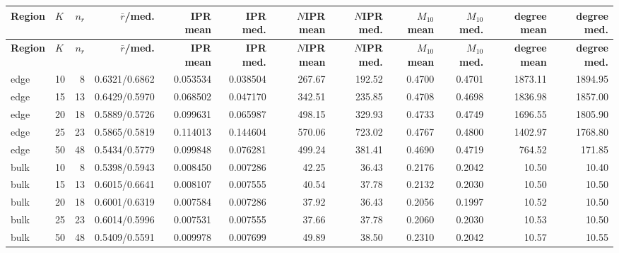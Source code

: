 \documentclass[10pt,letterpaper]{article}
\newcommand{\Hdr}[1]{\cellcolor{navy}\color{white}\bfseries #1}
\begin{document}
\scriptsize\setlength{\tabcolsep}{1.2pt}
\begin{longtable}{|l|l|r|r|r|r|r|r|r|r|r|r|}\hline
\Hdr{Region} & \Hdr{$K$} & \Hdr{$n_r$} & \Hdr{$\bar r$/med.} & \Hdr{IPR mean} & \Hdr{IPR med.} & \Hdr{$N$IPR mean} & \Hdr{$N$IPR med.} & \Hdr{$M_{10}$ mean} & \Hdr{$M_{10}$ med.} & \Hdr{degree mean} & \Hdr{degree med.}\\\hline\endfirsthead
\hline \Hdr{Region} & \Hdr{$K$} & \Hdr{$n_r$} & \Hdr{$\bar r$/med.} & \Hdr{IPR mean} & \Hdr{IPR med.} & \Hdr{$N$IPR mean} & \Hdr{$N$IPR med.} & \Hdr{$M_{10}$ mean} & \Hdr{$M_{10}$ med.} & \Hdr{degree mean} & \Hdr{degree med.}\\\hline\endhead
edge & 10 & 8 & 0.6321/0.6862 & 0.053534 & 0.038504 & 267.67 & 192.52 & 0.4700 & 0.4701 & 1873.11 & 1894.95 \\\hline
edge & 15 & 13 & 0.6429/0.5970 & 0.068502 & 0.047170 & 342.51 & 235.85 & 0.4708 & 0.4698 & 1836.98 & 1857.00 \\\hline
edge & 20 & 18 & 0.5889/0.5726 & 0.099631 & 0.065987 & 498.15 & 329.93 & 0.4733 & 0.4749 & 1696.55 & 1805.90 \\\hline
edge & 25 & 23 & 0.5865/0.5819 & 0.114013 & 0.144604 & 570.06 & 723.02 & 0.4767 & 0.4800 & 1402.97 & 1768.80 \\\hline
edge & 50 & 48 & 0.5434/0.5779 & 0.099848 & 0.076281 & 499.24 & 381.41 & 0.4690 & 0.4719 & 764.52 & 171.85 \\\hline
\hline
bulk & 10 & 8 & 0.5398/0.5943 & 0.008450 & 0.007286 & 42.25 & 36.43 & 0.2176 & 0.2042 & 10.50 & 10.40 \\\hline
bulk & 15 & 13 & 0.6015/0.6641 & 0.008107 & 0.007555 & 40.54 & 37.78 & 0.2132 & 0.2030 & 10.50 & 10.50 \\\hline
bulk & 20 & 18 & 0.6001/0.6319 & 0.007584 & 0.007286 & 37.92 & 36.43 & 0.2056 & 0.1997 & 10.52 & 10.50 \\\hline
bulk & 25 & 23 & 0.6014/0.5996 & 0.007531 & 0.007555 & 37.66 & 37.78 & 0.2060 & 0.2030 & 10.53 & 10.50 \\\hline
bulk & 50 & 48 & 0.5409/0.5591 & 0.009978 & 0.007699 & 49.89 & 38.50 & 0.2310 & 0.2042 & 10.57 & 10.55 \\\hline
\hline
\hline\end{longtable}
\normalsize
\end{document}
